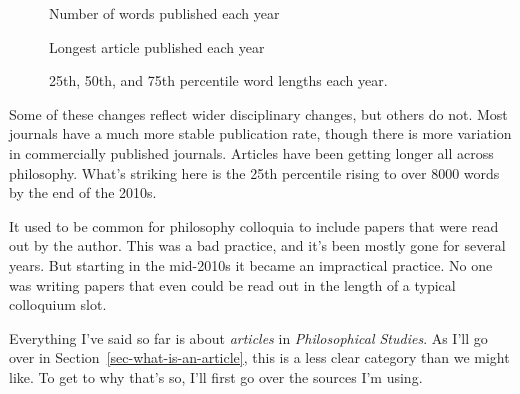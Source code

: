\documentclass[
  10pt,
  letterpaper,
  DIV=11,
  numbers=noendperiod,
  twoside]{scrartcl}
\begin{document}
\begin{figure}


\caption{\label{fig-word-count-by-year}Number of words published each
year}

\end{figure}%

\begin{figure}


\caption{\label{fig-word-max-by-year}Longest article published each
year}

\end{figure}%

\begin{figure}


\caption{\label{fig-word-quartiles}25th, 50th, and 75th percentile word
lengths each year.}

\end{figure}%

Some of these changes reflect wider disciplinary changes, but others do
not. Most journals have a much more stable publication rate, though
there is more variation in commercially published journals. Articles
have been getting longer all across philosophy. What's striking here is
the 25th percentile rising to over 8000 words by the end of the 2010s.

It used to be common for philosophy colloquia to include papers that
were read out by the author. This was a bad practice, and it's been
mostly gone for several years. But starting in the mid-2010s it became
an impractical practice. No one was writing papers that even could be
read out in the length of a typical colloquium slot.

Everything I've said so far is about \emph{articles} in
\emph{Philosophical Studies}. As I'll go over in
Section~\ref{sec-what-is-an-article}, this is a less clear category than
we might like. To get to why that's so, I'll first go over the sources
I'm using.
\end{document}
